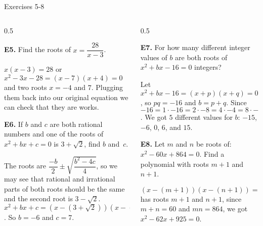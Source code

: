 \documentclass[9pt,aspectratio=169,handout]{beamer}
\begin{document}
\begin{frame}{Exercises 5-8}
  \begin{columns}[T]
    \begin{column}{0.5\textwidth}
      \begin{problem}
        \textbf{E5.} Find the roots of $x = \dfrac{28}{x - 3}$.
      \end{problem}
      $x(x - 3) = 28$ or $x^2 - 3x - 28 = (x - 7)(x + 4) = 0$ and two roots $x = \boxed{-4}$ and $\boxed{7}$. Plugging them back into our original equation we can check that they are works.
      \begin{problem}
        \textbf{E6.} If $b$ and $c$ are both rational numbers and one of the roots of $x^2 + bx + c = 0$ is $3 + \sqrt{2}$, find $b$ and~$c$.
      \end{problem}
      The roots are $\dfrac{-b}{2} \pm \sqrt{\dfrac{b^2 - 4c}{4}}$, so we may see that rational and irrational parts of both roots should be the same and the second root is $3 - \sqrt{2}$. $x^2 + bx + c = (x - (3 +\sqrt{2}))(x - (3 - \sqrt{2})) = x^2 - 6x + 7 = 0$. So $b = -6$ and $c = 7$.
    \end{column}
    \begin{column}{0.5\textwidth}
      \begin{problem}
        \textbf{E7.} For how many different integer values of $b$ are both roots of $x^2 + bx - 16 = 0$ integers?
      \end{problem}
      Let $x^2 + bx - 16 = (x + p)(x + q) = 0$, so $pq = -16$ and $b = p + q$. Since $-16 = 1\cdot -16 = 2\cdot -8 = 4\cdot -4 = 8\cdot -2 = 16\cdot -1 = -1\cdot 16= -2\cdot 8= -4\cdot 4= -8\cdot 2= -16\cdot 1$. We got $\boxed{5}$ different values for $b$: $-15$, $-6$, $0$, $6$, and $15$.
      \begin{problem}
        \textbf{E8.} Let $m$ and $n$ be roots of: $x^2 - 60x + 864 = 0$.  Find a polynomial with roots $m + 1$ and $n + 1$.
      \end{problem}
      $(x - (m + 1))(x - (n +1)) = x^2 - (m + n + 2)x + (mn + m + n + 1) = 0$ has roots $m +1$ and $n +1$, since $m + n = 60$ and $mn = 864$, we got $\boxed{x^2 - 62x + 925 = 0}$.
    \end{column}
  \end{columns}
\end{frame}
\end{document}
